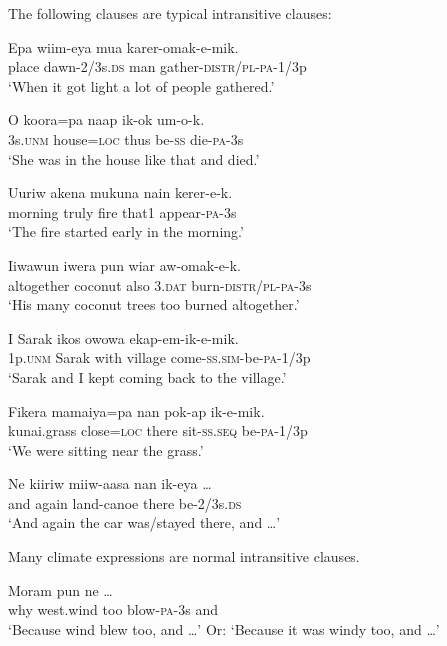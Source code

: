 The following clauses are typical intransitive clauses:

\ea%
\label{ex:5:x961}
\gll Epa  wiim-eya  mua  karer-omak-e-mik. \\
     place  dawn-2/3s.\textsc{ds}  man  gather-\textsc{distr}/\textsc{pl}-\textsc{pa}-1/3p \\
\glt `When it got light a lot of people gathered.'
\z

\ea%
\label{ex:5:x964}
\gll O  koora=pa  naap  ik-ok  um-o-k. \\
     3s.\textsc{unm}  house=\textsc{loc}  thus  be-\textsc{ss}  die-\textsc{pa}-3s \\
\glt `She was in the house like that and died.'
\z

\ea%
\label{ex:5:x959}
\gll Uuriw  akena  mukuna  nain  kerer-e-k. \\
     morning  truly  fire  that1  appear-\textsc{pa}-3s \\
\glt `The fire started early in the morning.'
\z

\ea%
\label{ex:5:x960}
\gll Iiwawun  iwera  pun  wiar  aw-omak-e-k. \\
     altogether  coconut  also  3.\textsc{dat}  burn-\textsc{distr}/\textsc{pl}-\textsc{pa}-3s \\
\glt `His many coconut trees too burned altogether.'
\z

\ea%
\label{ex:5:x965}
\gll I  Sarak  ikos  owowa  ekap-em-ik-e-mik. \\
     1p.\textsc{unm}  Sarak  with  village  come-\textsc{ss}.\textsc{sim}-be-\textsc{pa}-1/3p \\
\glt `Sarak and I kept coming back to the village.'
\z

\ea%
\label{ex:5:x962}
\gll Fikera  mamaiya=pa  nan  pok-ap  ik-e-mik. \\
     kunai.grass  close=\textsc{loc}  there  sit-\textsc{ss}.\textsc{seq}  be-\textsc{pa}-1/3p \\
\glt `We were sitting near the  grass.'
\z

\ea%
\label{ex:5:x968}
\gll Ne  kiiriw  miiw-aasa  nan  ik-eya  {\dots} \\
     and  again  land-canoe  there  be-2/3s.\textsc{ds} \\
\glt `And again the car was/stayed there, and {\dots}'
\z

Many climate expressions are normal intransitive clauses.

\ea%
\label{ex:5:x1020}
\gll Moram   pun    ne  {\dots} \\
     why  west.wind  too  blow-\textsc{pa}-3s  and \\
\glt `Because wind blew too, and {\dots}' Or: `Because it was windy too, and {\dots}'
\z

